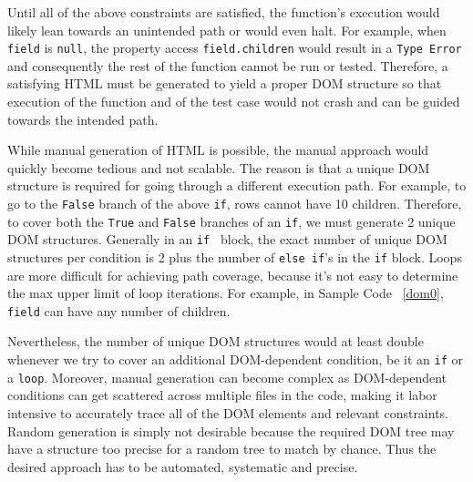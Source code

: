 Until all of the above constraints are satisfied, the function's execution would likely lean towards an unintended path or would even halt.   
For example, when {\tt field} is {\tt null}, the property access {\tt field.children} would result in a {\tt Type Error} and consequently the rest of the function cannot be run or tested.  
Therefore, a satisfying HTML must be generated to yield a proper DOM structure so that execution of the function and of the test case would not crash and can be guided towards the intended path.  

While manual generation of HTML is possible, the manual approach would quickly become tedious and not scalable.  
The reason is that a unique DOM structure is required for going through a different execution path.
For example, to go to the {\tt False} branch of the above {\tt if}, rows cannot have 10 children.
Therefore, to cover both the {\tt True} and {\tt False} branches of an {\tt if}, we must generate 2 unique DOM structures.  
Generally in an {\tt if } block, the exact number of unique DOM structures per condition is 2 plus the number of {\tt else if}'s in the {\tt if} block.  
Loops are more difficult for achieving path coverage, because it's not easy to determine the max upper limit of loop iterations.  For example, in Sample Code ~\ref{dom0}, {\tt field} can have any number of children.

Nevertheless, the number of unique DOM structures would at least double whenever we try to cover an additional DOM-dependent condition, be it an {\tt if} or a {\tt loop}.  
Moreover, manual generation can become complex as DOM-dependent conditions can get scattered across multiple files in the code, making it labor intensive to accurately trace all of the DOM elements and relevant constraints.  
Random generation is simply not desirable because the required DOM tree may have a structure too precise for a random tree to match by chance.  
Thus the desired approach has to be automated, systematic and precise.


